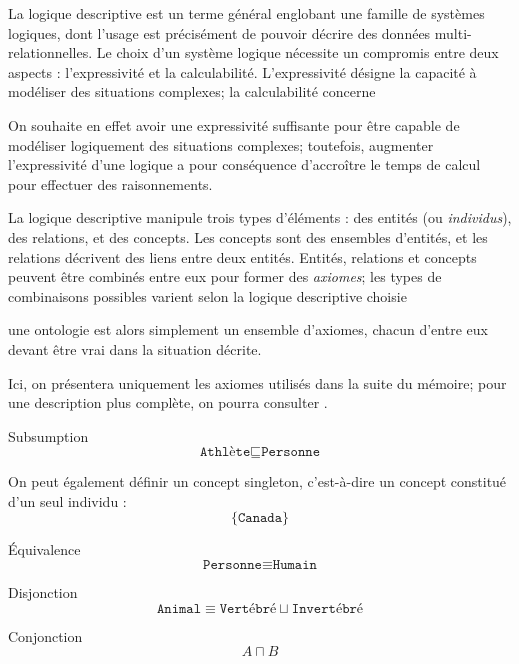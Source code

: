 
La logique descriptive est un terme général englobant une famille de systèmes logiques, dont l'usage est précisément de pouvoir décrire des données multi-relationnelles. 
Le choix d'un système logique nécessite un compromis entre deux aspects : l'expressivité et la calculabilité. L'expressivité désigne la capacité à modéliser des situations complexes; la calculabilité concerne 

On souhaite en effet avoir une expressivité suffisante pour être capable de modéliser logiquement des situations complexes; toutefois, augmenter l'expressivité d'une logique a pour conséquence d'accroître le temps de calcul pour effectuer des raisonnements.


La logique descriptive manipule trois types d'éléments : des entités (ou \textit{individus}), des relations, et des concepts. Les concepts sont des ensembles d'entités, et les relations décrivent des liens entre deux entités. Entités, relations et concepts peuvent être combinés entre eux pour former des \textit{axiomes}; les types de combinaisons possibles varient selon la logique descriptive choisie

une ontologie est alors simplement un ensemble d'axiomes, chacun d'entre eux devant être vrai dans la situation décrite.

Ici, on présentera uniquement les axiomes utilisés dans la suite du mémoire; pour une description plus complète, on pourra consulter \cite{krotzsch2013description}. 

Subsumption 
\begin{equation}
    \texttt{Athlète} \sqsubseteq \texttt{Personne}
\end{equation}


On peut également définir un concept singleton, c'est-à-dire un concept constitué d'un seul individu :
\begin{equation}
    \{ \texttt{Canada} \}
\end{equation}

Équivalence
\begin{equation}
    \texttt{Personne} \equiv \texttt{Humain}
\end{equation}

Disjonction
\begin{equation}
    \texttt{Animal} \equiv \texttt{Vertébré} \sqcup \texttt{Invertébré}
\end{equation}

Conjonction
\begin{equation}
    A \sqcap B
\end{equation}


